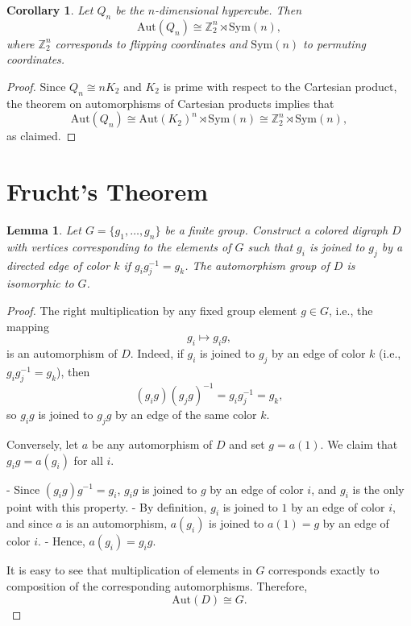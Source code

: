 \documentclass[12pt,a4paper,openany]{book}
\newtheorem{lemma}{Lemma}[section]
\newtheorem{corollary}{Corollary}[section]
\begin{document}
\begin{corollary}
Let $Q_n$ be the $n$-dimensional hypercube. Then
\[
\mathrm{Aut}(Q_n) \cong \mathbb{Z}_2^n \rtimes \mathrm{Sym}(n),
\]
where $\mathbb{Z}_2^n$ corresponds to flipping coordinates and $\mathrm{Sym}(n)$ to permuting coordinates.
\end{corollary}

\begin{proof}
Since $Q_n \cong nK_2$ and $K_2$ is prime with respect to the Cartesian product, the theorem on automorphisms of Cartesian products implies that
\[
\mathrm{Aut}(Q_n) \cong \mathrm{Aut}(K_2)^n \rtimes \mathrm{Sym}(n) \cong \mathbb{Z}_2^n \rtimes \mathrm{Sym}(n),
\]
as claimed.
\end{proof}



\section{Frucht's Theorem}

\begin{lemma}  
Let $G = \{g_1, \dots, g_n\}$ be a finite group. Construct a colored digraph $D$ with vertices corresponding to the elements of $G$ such that $g_i$ is joined to $g_j$ by a directed edge of color $k$ if $g_i g_j^{-1} = g_k$.  The automorphism group of $D$ is isomorphic to $G$.
\end{lemma}

\begin{proof}  
The right multiplication by any fixed group element $g \in G$, i.e., the mapping 
\[
g_i \mapsto g_i g,
\] 
is an automorphism of $D$. Indeed, if $g_i$ is joined to $g_j$ by an edge of color $k$ (i.e., $g_i g_j^{-1} = g_k$), then
\[
(g_i g)(g_j g)^{-1} = g_i g_j^{-1} = g_k,
\] 
so $g_i g$ is joined to $g_j g$ by an edge of the same color $k$.  

Conversely, let $a$ be any automorphism of $D$ and set $g = a(1)$. We claim that $g_i g = a(g_i)$ for all $i$.  

- Since $(g_i g) g^{-1} = g_i$, $g_i g$ is joined to $g$ by an edge of color $i$, and $g_i$ is the only point with this property.  
- By definition, $g_i$ is joined to $1$ by an edge of color $i$, and since $a$ is an automorphism, $a(g_i)$ is joined to $a(1) = g$ by an edge of color $i$.  
- Hence, $a(g_i) = g_i g$.

It is easy to see that multiplication of elements in $G$ corresponds exactly to composition of the corresponding automorphisms. Therefore,
\[
\mathrm{Aut}(D) \cong G.
\]  
\end{proof}
\end{document}

